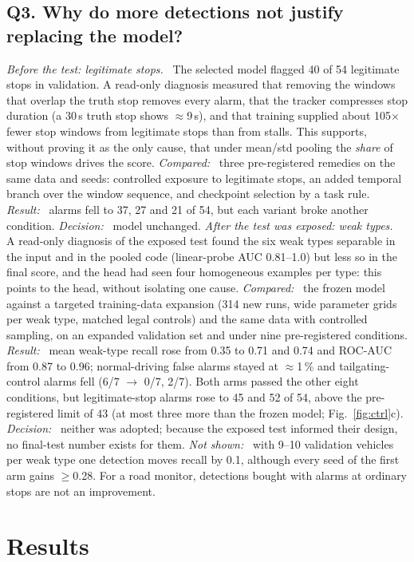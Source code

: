\documentclass[10pt,a4paper,twocolumn]{article}
\newcommand{\lab}[1]{\textit{#1}\ }
\begin{document}
\subsection*{Q3. Why do more detections not justify replacing the model?}
\lab{Before the test: legitimate stops.} The selected model flagged 40 of 54 legitimate stops in validation. A read-only diagnosis measured that removing the windows that overlap the truth stop removes every alarm, that the tracker compresses stop duration (a 30\,s truth stop shows $\approx$9\,s), and that training supplied about 105$\times$ fewer stop windows from legitimate stops than from stalls. This supports, without proving it as the only cause, that under mean/std pooling the \emph{share} of stop windows drives the score. \lab{Compared:} three pre-registered remedies on the same data and seeds: controlled exposure to legitimate stops, an added temporal branch over the window sequence, and checkpoint selection by a task rule. \lab{Result:} alarms fell to 37, 27 and 21 of 54, but each variant broke another condition. \lab{Decision:} model unchanged.
\lab{After the test was exposed: weak types.} A read-only diagnosis of the exposed test found the six weak types separable in the input and in the pooled code (linear-probe AUC 0.81--1.0) but less so in the final score, and the head had seen four homogeneous examples per type: this points to the head, without isolating one cause. \lab{Compared:} the frozen model against a targeted training-data expansion (314 new runs, wide parameter grids per weak type, matched legal controls) and the same data with controlled sampling, on an expanded validation set and under nine pre-registered conditions. \lab{Result:} mean weak-type recall rose from 0.35 to 0.71 and 0.74 and ROC-AUC from 0.87 to 0.96; normal-driving false alarms stayed at $\approx$1\,\% and tailgating-control alarms fell (6/7 $\to$ 0/7, 2/7). Both arms passed the other eight conditions, but legitimate-stop alarms rose to 45 and 52 of 54, above the pre-registered limit of 43 (at most three more than the frozen model; Fig.~\ref{fig:ctrl}c). \lab{Decision:} neither was adopted; because the exposed test informed their design, no final-test number exists for them. \lab{Not shown:} with 9--10 validation vehicles per weak type one detection moves recall by 0.1, although every seed of the first arm gains $\ge$0.28. For a road monitor, detections bought with alarms at ordinary stops are not an improvement.

\section{Results}\label{sec:res}
\end{document}
